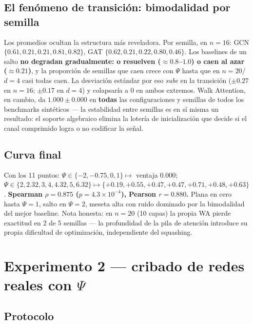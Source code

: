 \documentclass[11pt]{article}
\begin{document}
\subsection{El fen\'omeno de transici\'on: bimodalidad por semilla}

Los promedios ocultan la estructura m\'as reveladora. Por semilla, en
$n{=}16$: GCN $\{0.61, 0.21, 0.21, 0.81, 0.82\}$, GAT
$\{0.62, 0.21, 0.22, 0.80, 0.46\}$. Los baselines de un salto \textbf{no
degradan gradualmente: o resuelven ($\approx0.8$--$1.0$) o caen al azar
($\approx0.21$)}, y la proporci\'on de semillas que caen crece con $\Psi$
hasta que en $n{=}20$/$d{=}4$ casi todas caen. La desviaci\'on est\'andar
por eso \emph{sube} en la transici\'on ($\pm0.27$ en $n{=}16$;
$\pm0.17$ en $d{=}4$) y colapsar\'ia a $0$ en ambos extremos. Walk
Attention, en cambio, da $1.000\pm0.000$ en \textbf{todas} las
configuraciones y semillas de todos los benchmarks sint\'eticos --- la
estabilidad entre semillas es en s\'i misma un resultado: el soporte
algebraico elimina la loter\'ia de inicializaci\'on que decide si el canal
comprimido logra o no codificar la se\~nal.

\subsection{Curva final}

Con los 11 puntos: $\Psi\in\{-2,-0.75,0,1\}\mapsto$ ventaja $0.000$;
$\Psi\in\{2,2.32,3,4,4.32,5,6.32\}\mapsto
\{+0.19,+0.55,+0.47,+0.47,+0.71,+0.48,+0.63\}$.
\textbf{Spearman $\rho=0.875$ ($p=4.3\times10^{-4}$), Pearson $r=0.880$.}
Plana en cero hasta $\Psi=1$, salto en $\Psi=2$, meseta alta con ruido
dominado por la bimodalidad del mejor baseline. Nota honesta: en $n{=}20$
(10 capas) la propia WA pierde exactitud en 2 de 5 semillas --- la
profundidad de la pila de atenci\'on introduce su propia dificultad de
optimizaci\'on, independiente del squashing.

\section{Experimento 2 --- cribado de redes reales con $\Psi$}

\subsection{Protocolo}
\end{document}
